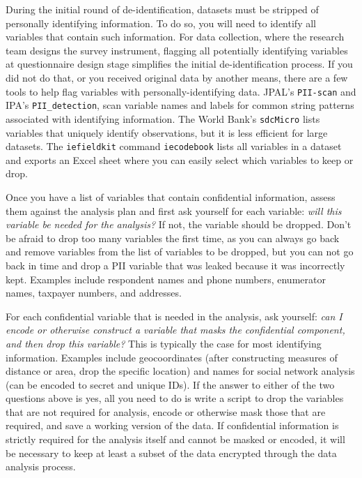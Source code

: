 During the initial round of de-identification, 
datasets must be stripped of personally identifying information.
To do so, you will need to identify all variables that contain
such information.
For data collection, where the research team designs the survey instrument,
flagging all potentially identifying variables at questionnaire design stage
simplifies the initial de-identification process.
If you did not do that, or you received original data by another means,
there are a few tools to help flag variables with personally-identifying data.
JPAL's \texttt{PII-scan} and
IPA's \texttt{PII\_detection}, 
scan variable names and labels for common string patterns associated with identifying information.
The World Bank's \texttt{sdcMicro}
lists variables that uniquely identify observations, 
but it is less efficient for large datasets.
The \texttt{iefieldkit} command \texttt{iecodebook}
lists all variables in a dataset and exports an Excel sheet
where you can easily select which variables to keep or drop.

Once you have a list of variables that contain confidential information,
assess them against the analysis plan and first ask yourself for each variable:
\textit{will this variable be needed for the analysis?}
If not, the variable should be dropped.
Don't be afraid to drop too many variables the first time,
as you can always go back and remove variables from the list of variables to be dropped,
but you can not go back in time and drop a PII variable that was leaked
because it was incorrectly kept.
Examples include respondent names and phone numbers, enumerator names, taxpayer 
numbers, and addresses.

For each confidential variable that is needed in the analysis, ask yourself:
\textit{can I encode or otherwise construct a variable that masks the confidential component, and
	then drop this variable?}
This is typically the case for most identifying information.
Examples include geocoordinates
(after constructing measures of distance or area,
drop the specific location)
and names for social network analysis (can be encoded to secret and unique IDs).
If the answer to either of the two questions above is yes,
all you need to do is write a script to drop the variables that are not required for analysis,
encode or otherwise mask those that are required,
and save a working version of the data.
If confidential information is strictly required for the analysis itself and cannot be
masked or encoded,
it will be necessary to keep at least a subset of the data encrypted through
the data analysis process.

